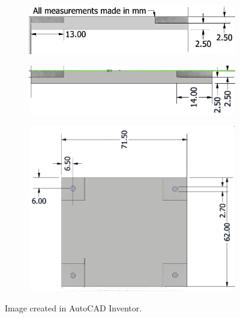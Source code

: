 \documentclass{article}
\begin{document}
     \begin{figure}[h]
          \centering
          \begin{subfigure}{0.4\textwidth}
               \includegraphics[scale=0.25]{images/hat_1}
          \end{subfigure}
          \begin{subfigure}{0.4\textwidth}
               \includegraphics[scale=0.2]{images/hat_2}
          \end{subfigure}
          \begin{subfigure}{0.4\textwidth}
               \includegraphics[scale=0.25]{images/hat_3}
          \end{subfigure}
          \caption[Blueprint of 3D Printed Stand]{Image created in AutoCAD Inventor.}
          \label{fig:hat-holder}
     \end{figure}
\end{document}
